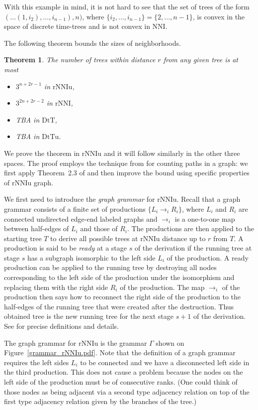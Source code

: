 \documentclass{amsart}
\newtheorem{theorem}[lemma]{Theorem}
\theoremstyle{definition}
\newcommand{\nni}{\mathrm{NNI}}
\newcommand{\rnni}{\mathrm{rNNI}}
\newcommand{\rnniu}{\mathrm{rNNIu}}
\newcommand{\mdts}{\mathrm{DtT}}
\newcommand{\mdtsu}{\mathrm{DtTu}}
\begin{document}
With this example in mind, it is not hard to see that the set of trees of the form $(\ldots(1, i_2), \ldots, i_{n-1}), n)$, where $\{i_2, \ldots, i_{n-1}\} = \{2, \ldots, n-1\}$, is convex in the space of discrete time-trees and is not convex in $\nni$.

The following theorem bounds the sizes of neighborhoods.

\begin{theorem}\label{neighSizeTh}
The number of trees within distance $r$ from any given tree is at most
\begin{itemize}
\item[] $3^{n+2r-1}$ in $\rnniu$,
\item[] $3^{2n+2r-2}$ in $\rnni$,
\item[] TBA in $\mdts$,
\item[] TBA in $\mdtsu$.
\end{itemize}
\end{theorem}

\proof
We prove the theorem in $\rnniu$ and it will follow similarly in the other three spaces.
The proof employs the technique from \autocite{Sleator1992-bp} for counting paths in a graph: we first apply Theorem~2.3 of \textcite{Sleator1992-bp} and then improve the bound using specific properties of $\rnniu$ graph.

We first need to introduce the {\em graph grammar} for $\rnniu$.
Recall that a graph grammar consists of a finite set of productions $\{L_i \to_i R_i\}$, where $L_i$ and $R_i$ are connected undirected edge-end labeled graphs and $\to_i$ is a one-to-one map between half-edges of $L_i$ and those of $R_i$.
The productions are then applied to the starting tree $T$ to derive all possible trees at $\rnniu$ distance up to $r$ from $T$.
A production is said to be {\em ready} at a stage $s$ of the derivation if the running tree at stage $s$ has a subgraph isomorphic to the left side $L_i$ of the production.
A ready production can be applied to the running tree by destroying all nodes corresponding to the left side of the production under the isomorphism and replacing them with the right side $R_i$ of the production.
The map $\to_i$ of the production then says how to reconnect the right side of the production to the half-edges of the running tree that were created after the destruction.
Thus obtained tree is the new running tree for the next stage $s+1$ of the derivation.
See \autocite{Sleator1992-bp} for precise definitions and details.

The graph grammar for $\rnniu$ is the grammar $\Gamma$ shown on Figure~\ref{grammar_rNNIu.pdf}.
Note that the definition of a graph grammar requires the left sides $L_i$ to be connected and we have a disconnected left side in the third production.
This does not cause a problem because the nodes on the left side of the production must be of consecutive ranks.
(One could think of those nodes as being adjacent via a second type adjacency relation on top of the first type adjacency relation given by the branches of the tree.)
\end{document}
